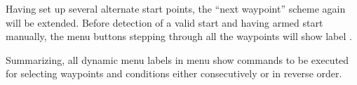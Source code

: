 Having set up several alternate start points, the ``next waypoint'' scheme again will be extended. Before detection of a valid start and having armed start manually, the menu buttons stepping through all the waypoints will show label .

Summarizing, all dynamic menu labels in menu  show commands to be 
executed for selecting waypoints and conditions either consecutively or in reverse 
order. 

  








